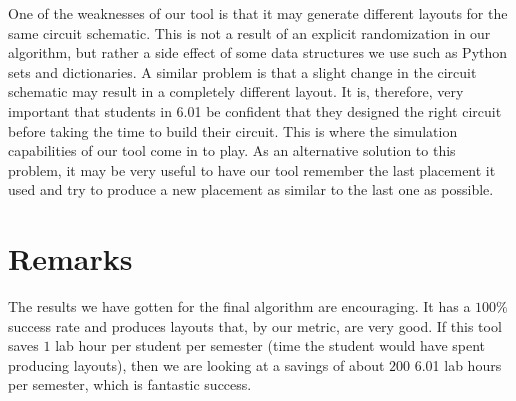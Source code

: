 One of the weaknesses of our tool is that it may generate different layouts for
the same circuit schematic. This is not a result of an explicit randomization
in our algorithm, but rather a side effect of some data structures we use such
as Python sets and dictionaries. A similar problem is that a slight change in
the circuit schematic may result in a completely different layout. It is,
therefore, very important that students in 6.01 be confident that they designed
the right circuit before taking the time to build their circuit.
This is where the simulation
capabilities of our tool come in to play. As an alternative solution to this
problem, it may be very useful to have our
tool remember the last placement it used and try to produce a new placement as
similar to the last one as possible.

\section{Remarks}

The results we have gotten for the final algorithm are encouraging.
It has a $100\%$ success rate and produces layouts that, by our metric, are very
good. If this tool saves $1$ lab hour per student per semester (time the
student would have spent producing layouts), then we are
looking at a savings of about $200$ 6.01 lab hours per semester, which is
fantastic success.

